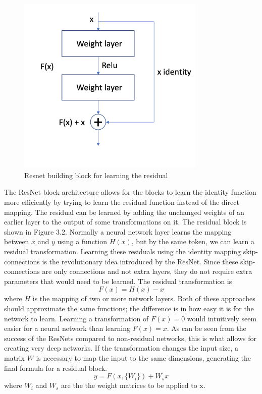 \begin{figure}[h!] 
\centering 
\includegraphics[width=0.8\textwidth]{imgs/resnet-block-own.png}
\caption{Resnet building block for learning the residual \citep{resNet}}
\end{figure}

The ResNet block architecture allows for the blocks to learn the identity function more efficiently by trying to learn the residual function instead of the direct mapping. The residual can be learned by adding the unchanged weights of an earlier layer to the output of some transformations on it.
The residual block is shown in Figure 3.2.
Normally a neural network layer learns the mapping between ${x}$ and ${y}$ using a function ${H(x)}$, but by the same token, we can learn a residual transformation.
Learning these residuals using the identity mapping skip-connections is the revolutionary idea introduced by the ResNet.
Since these skip-connections are only connections and not extra layers, they do not require extra parameters that would need to be learned.
The residual transformation is
\[{F(x) = H(x) - x}\] \noindent where ${H}$ is the mapping of two or more network layers. Both of these approaches should approximate the same functions; the difference is in how easy it is for the network to learn. Learning a transformation of ${F(x) = 0}$ would intuitively seem easier for a neural network than learning ${F(x) = x}$. As can be seen from the success of the ResNets compared to non-residual networks, this is what allows for creating very deep networks. If the transformation changes the input size, a matrix ${W}$ is necessary to map the input to the same dimensions, generating the final formula for a residual block. \[y = F(x, \{W_i\}) + W_s x\] \noindent where $W_i$ and $W_s$ are the the weight matrices to be applied to x.


